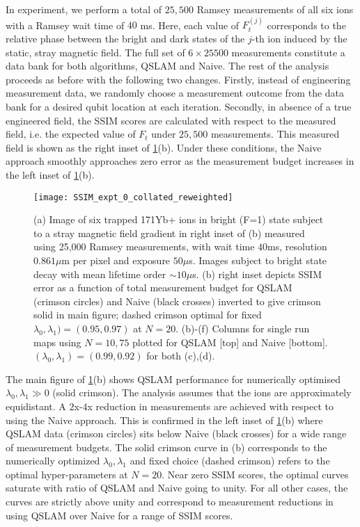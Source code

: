 In experiment, we perform a total of $25,500$ Ramsey measurements of all six ions with a Ramsey wait time of $40$ ms. Here, each value of $F_t^{(j)}$ corresponds to the relative phase between the bright and dark states of the $j$-th ion induced by the static, stray magnetic field. The full set of $6 \times 25500$ measurements constitute a data bank for both algorithms, QSLAM and Naive. The rest of the analysis proceeds as before with the following two changes. Firstly, instead of engineering measurement data, we randomly choose a measurement outcome from the data bank for a desired qubit location at each iteration. Secondly, in absence of a true engineered field, the SSIM scores are calculated with respect to the measured field, i.e. the expected value of $F_t$ under $25,500$ measurements. This measured field is shown as the right inset of \cref{SSIM_expt_0_collated_reweighted}(b). Under these conditions, the Naive approach smoothly approaches zero error as the measurement budget increases in the left inset of \cref{SSIM_expt_0_collated_reweighted}(b). 
\begin{figure}
	\texttt{[image: SSIM\_expt\_0\_collated\_reweighted]}
	\caption{\label{SSIM_expt_0_collated_reweighted} (a) Image of six trapped 171Yb+ ions in bright (F=1) state subject to a stray magnetic field gradient in right inset of (b) measured using 25,000 Ramsey measurements, with wait time $40$ms, resolution $0.861 \mu$m per pixel and exposure $50 \mu$s. Images subject to bright state decay with mean lifetime order $\sim 10\mu$s. (b) right inset depicts SSIM error as a function of total measurement budget for QSLAM (crimson circles) and Naive (black crosses) inverted to give crimson solid in main figure; dashed crimson optimal for fixed  $\lambda_0, \lambda_1) = (0.95, 0.97) $ at $N=20$. (b)-(f) Columns for single run maps using $N=10, 75$ plotted for QSLAM [top] and Naive [bottom]. $(\lambda_0, \lambda_1)= (0.99, 0.92)$ for both (c),(d).}    	
\end{figure}
The main figure of \cref{SSIM_expt_0_collated_reweighted}(b) shows QSLAM performance for numerically optimised $\lambda_0, \lambda_1 \gg 0$ (solid crimson). The analysis assumes that the ions are approximately equidistant. A $2$x-$4$x reduction in measurements are achieved with respect to using the Naive approach. This is confirmed in the left inset of \cref{SSIM_expt_0_collated_reweighted}(b) where QSLAM data (crimson circles) sits below Naive (black crosses) for a wide range of measurement budgets. The solid crimson curve in (b) corresponds to the numerically optimized $\lambda_0, \lambda_1$ and fixed choice (dashed crimson) refers to the optimal hyper-parameters at $N=20$. Near zero SSIM scores, the optimal curves saturate with ratio of QSLAM and Naive going to unity. For all other cases, the curves are strictly above unity and correspond to measurement reductions in using QSLAM over Naive for a range of SSIM scores. 

